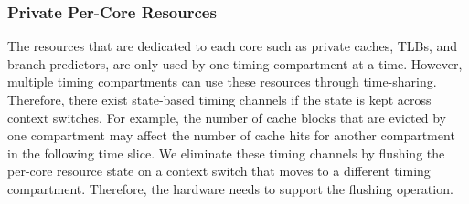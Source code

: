 \subsubsection{Private Per-Core Resources}

The resources that are dedicated to each core such as private caches,
TLBs, and branch predictors, are only used by one timing compartment at a time.
However, multiple timing compartments can use these resources through 
time-sharing. Therefore, there exist state-based timing channels if the state 
is
kept across context switches. For example, the number of cache blocks that
are evicted by one compartment may affect the number of cache hits for
another compartment in the following time slice.
We eliminate these timing channels by flushing the per-core resource state on a 
context switch that moves to a different timing compartment.
Therefore, the hardware needs to support the flushing operation.



